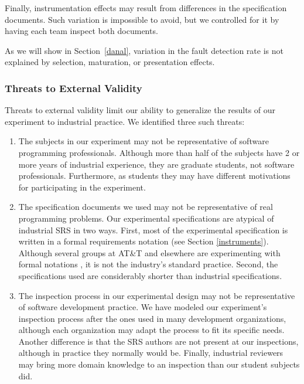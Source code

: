 Finally, instrumentation effects may result from 
differences in the specification documents.
Such variation is impossible to avoid, 
but we controlled for it by having each team 
inspect both documents.

As we will show in Section~\ref{danal}, 
variation in the fault detection rate is 
not explained by selection, maturation, or
presentation effects.


\subsubsection{Threats to External Validity}
\label{external}

Threats to external validity limit our ability to 
generalize the results of our experiment to industrial
practice.  We identified three such threats:

\begin{enumerate}
\item The subjects in our experiment may not be 
representative of software programming professionals. Although more
than half of the subjects have 2 or more years of industrial
experience, they are graduate students, not software professionals.
Furthermore, as students they may have different motivations for
participating in the experiment.

\item The specification documents we used may not be representative of real 
programming problems. Our experimental specifications are atypical
of industrial SRS in two ways. First, most of the experimental 
specification is written in a formal requirements notation (see 
Section \ref{instruments}). Although several groups at AT\&T
and elsewhere are experimenting with formal 
notations \cite{ardis.1994,GCR.formal}, it is
not the industry's standard practice. Second, the specifications
used are considerably shorter than industrial specifications.

\item The inspection process in our experimental design may not be 
representative of software development practice. We have modeled our
experiment's inspection process after the ones used in many
development organizations, although each organization may 
adapt the process to fit its specific needs.
Another difference is that the SRS authors are not present at our inspections,
although in practice they normally would be.  Finally, industrial reviewers may 
bring more domain knowledge to an inspection than our student subjects did.
\end{enumerate}

